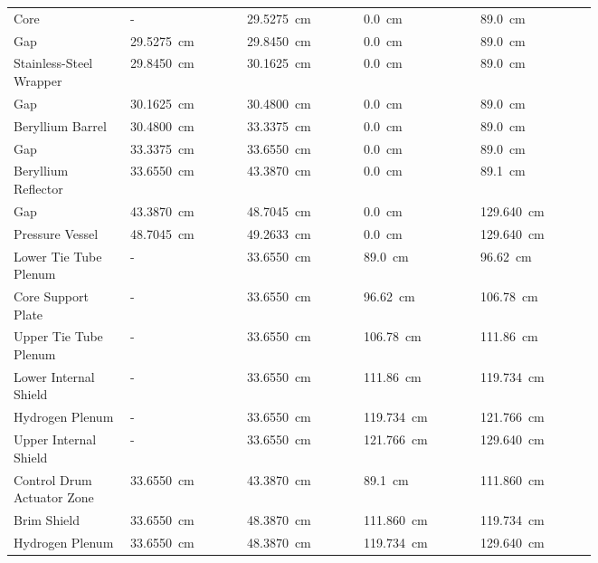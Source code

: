 \documentclass[8pt,a4paper]{article}
\begin{document}
\begin{longtable}{|m{0.15\linewidth}|m{0.15\linewidth}|m{0.15\linewidth}|m{0.15\linewidth}|m{0.15\linewidth}|}
    \hline
    \endlastfoot
    Core & - & \SI{29.5275}{cm} & \SI{0.0}{cm} & \SI{89.0}{cm} \\
    Gap & \SI{29.5275}{cm} & \SI{29.8450}{cm} &  \SI{0.0}{cm} & \SI{89.0}{cm} \\
    Stainless-Steel Wrapper & \SI{29.8450}{cm} & \SI{30.1625}{cm} &  \SI{0.0}{cm} & \SI{89.0}{cm} \\
    Gap & \SI{30.1625}{cm} & \SI{30.4800}{cm} &  \SI{0.0}{cm} & \SI{89.0}{cm} \\
    Beryllium Barrel & \SI{30.4800}{cm} & \SI{33.3375}{cm} &  \SI{0.0}{cm} & \SI{89.0}{cm} \\
    Gap & \SI{33.3375}{cm} & \SI{33.6550}{cm} &  \SI{0.0}{cm} & \SI{89.0}{cm} \\
    Beryllium Reflector & \SI{33.6550}{cm} & \SI{43.3870}{cm} & \SI{0.0}{cm} & \SI{89.1}{cm} \\
    Gap & \SI{43.3870}{cm} & \SI{48.7045}{cm} &  \SI{0.0}{cm} & \SI{129.640}{cm} \\
    Pressure Vessel & \SI{48.7045}{cm} & \SI{49.2633}{cm} &  \SI{0.0}{cm} & \SI{129.640}{cm} \\
    Lower Tie Tube Plenum & - & \SI{33.6550}{cm} & \SI{89.0}{cm} & \SI{96.62}{cm} \\
    Core Support Plate & - & \SI{33.6550}{cm} & \SI{96.62}{cm} & \SI{106.78}{cm} \\
    Upper Tie Tube Plenum & - & \SI{33.6550}{cm} & \SI{106.78}{cm} & \SI{111.86}{cm} \\
    Lower Internal Shield & - & \SI{33.6550}{cm} & \SI{111.86}{cm} & \SI{119.734}{cm} \\
    Hydrogen Plenum & - & \SI{33.6550}{cm} & \SI{119.734}{cm} & \SI{121.766}{cm} \\
    Upper Internal Shield & - & \SI{33.6550}{cm} & \SI{121.766}{cm} & \SI{129.640}{cm} \\
    Control Drum Actuator Zone & \SI{33.6550}{cm} & \SI{43.3870}{cm} & \SI{89.1}{cm} & \SI{111.860}{cm} \\
    Brim Shield & \SI{33.6550}{cm} & \SI{48.3870}{cm} & \SI{111.860}{cm} & \SI{119.734}{cm} \\
    Hydrogen Plenum & \SI{33.6550}{cm} & \SI{48.3870}{cm} & \SI{119.734}{cm} & \SI{129.640}{cm} \\
\end{longtable}
\end{document}
